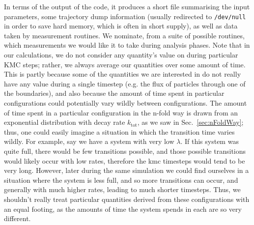 In terms of the output of the code, it produces a short file summarising the input parameters,
some trajectory dump information (usually redirected to \texttt{/dev/null} in order to save hard
memory, which is often in short supply), as well as data taken by measurement routines. We nominate,
from a suite of possible routines, which measurements we would like it to take during analysis phases.
Note that in our calculations, we do not consider any quantity's value on during particular KMC steps;
rather, we always average our quantities over some amount of time. This is partly because some of the
quantities we are interested in do not really have any value during a single timestep (e.g. the flux of
particles through one of the boundaries), and also because the amount of time spent in particular
configurations could potentially vary wildly between configurations. The amount of time spent in a
particular configuration in the n-fold way is drawn from an exponential distribution with decay rate
$k_{\mathrm{tot}}$, as we saw in Sec.~\ref{sec:nFoldWay}; thus, one could easily imagine a
situation in which the transition time varies wildly. For example, say we have a system with very low 
$\lambda$. If this system was quite full, there would be few transitions possible, and those possible
transitions would likely occur with low rates, therefore the kmc timesteps would tend to be very long.
However, later during the same simulation we could find ourselves in a situation where the system is
less full, and so more transitions can occur, and generally with much higher rates, leading to much
shorter timesteps. Thus, we shouldn't really treat particular quantities derived from these 
configurations with an equal footing, as the amounts of time the system spends in each are so very 
different.

